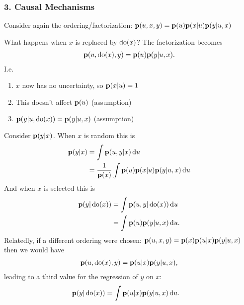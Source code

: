 \subsubsection{3. Causal Mechanisms}
Consider again the ordering/factorization: $\mathbf{p}(u, x, y) = \mathbf{p}(u)\mathbf{p}(x|u)\mathbf{p}(y|u, x)$
What happens when $x$ is replaced by $\operatorname{\text{do}}(x)$? The factorization becomes
\begin{align*}
  \mathbf{p}(u, \operatorname{\text{do}}(x), y) = \mathbf{p}(u)\mathbf{p}(y|u, x).
\end{align*}
I.e.
\begin{enumerate}
\item $x$ now has no uncertainty, so $\mathbf{p}(x|u) = 1$
\item This doesn't affect $\mathbf{p}(u)$ (assumption)
\item $\mathbf{p}(y|u, \operatorname{\text{do}}(x)) = \mathbf{p}(y|u, x)$ (assumption)
\end{enumerate}
Consider $\mathbf{p}(y|x)$. When $x$ is random this is
\begin{align*}
  \p(y|x)
  &= \int \p(u, y|x) \du \\
  &= \frac{1}{\p(x)}\int \p(u)\p(x|u)\p(y|u, x) \du
\end{align*}
And when $x$ is selected this is
\begin{align*}
  \p(y|\pdo(x))
  &= \int \p(u, y|\pdo(x)) \du \\
  &= \int \p(u)\p(y|u, x) \du.
\end{align*}
Relatedly, if a different ordering were chosen: $\mathbf{p}(u, x, y) = \mathbf{p}(x)\mathbf{p}(u|x)\mathbf{p}(y|u, x)$ then we would have
\begin{align*}
  \mathbf{p}(u, \operatorname{\text{do}}(x), y) = \mathbf{p}(u|x)\mathbf{p}(y|u, x),
\end{align*}
leading to a third value for the regression of $y$ on $x$:
\begin{align*}
  \p(y|\pdo(x))
  &= \int \p(u|x)\p(y|u, x) \du.
\end{align*}

